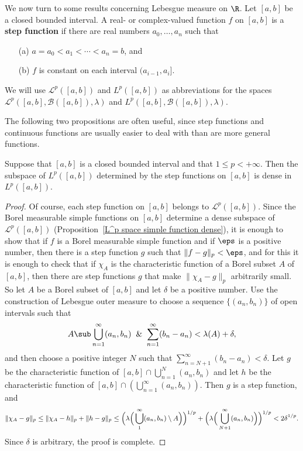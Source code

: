We now turn to some results concerning Lebesgue measure on $\R$. Let $[a,b]$ be a closed bounded interval. A real- or complex-valued function $f$ on $[a,b]$ is a \textbf{step function} if there are real numbers $a_0,\dots,a_n$ such that
\begin{itemize}
\item[(a)] $a=a_0<a_1<\cdots<a_n=b$, and 
\item[(b)] $f$ is constant on each interval $(a_{i-1},a_i]$.
\end{itemize}
We will use $\mathcal{L}^p([a,b])$ and $L^p([a,b])$ as abbreviations for the spaces $\mathcal{L}^p([a,b],\mathcal{B}([a,b]),\lambda)$ and $L^p([a,b],\mathcal{B}([a,b]),\lambda)$.\par
The following two propositions are often useful, since step functions and continuous functions are usually easier to deal with than are more general functions.
\begin{proposition}\label{L^p([a,b]) step function dense}
Suppose that $[a,b]$ is a closed bounded interval and that $1\leq p<+\infty$. Then the subspace of $L^p([a,b])$ determined by the step functions on $[a,b]$ is dense in $L^p([a,b])$.
\end{proposition}
\begin{proof}
Of course, each step function on $[a,b]$ belongs to $\mathcal{L}^p([a,b])$. Since the Borel measurable simple functions on $[a,b]$ determine a dense subspace of $\mathcal{L}^p([a,b])$ (Proposition~\ref{L^p space simple function dense}), it is enough to show that if $f$ is a Borel measurable simple function and if $\eps$ is a positive number, then there is a step function $g$ such that $\|f-g\|_p<\eps$, and for this it is enough to check that if $\chi_A$ is the characteristic function of a Borel subset $A$ of $[a,b]$, then there are step functions $g$ that make $\|\chi_A-g\|_p$ arbitrarily small. So let $A$ be a Borel subset of $[a,b]$ and let $\delta$ be a positive number. Use the construction of Lebesgue outer measure to choose a sequence $\{(a_n,b_n)\}$ of open intervals such that
\[A\sub\bigcup_{n=1}^{\infty}(a_n,b_n)\And\sum_{n=1}^{\infty}(b_n-a_n)<\lambda(A)+\delta,\]
and then choose a positive integer $N$ such that $\sum_{n=N+1}^{\infty}(b_n-a_n)<\delta$. Let $g$ be the characteristic function of $[a,b]\cap\bigcup_{n=1}^{N}(a_n,b_n)$ and let $h$ be the characteristic function of $[a,b]\cap(\bigcup_{n=1}^{\infty}(a_n,b_n))$. Then $g$ is a step function, and
\begin{equation*}\small
\begin{aligned}
\|\chi_A-g\|_p\leq\|\chi_A-h\|_p+\|h-g\|_p\leq\Big(\lambda\Big(\bigcup_{1}^{\infty}(a_n,b_n)\setminus A\Big)\Big)^{1/p}+\Big(\lambda\Big(\bigcup_{N+1}^{\infty}(a_n,b_n)\Big)\Big)^{1/p}<2\delta^{1/p}.
\end{aligned}
\end{equation*}
Since $\delta$ is arbitrary, the proof is complete.
\end{proof}
